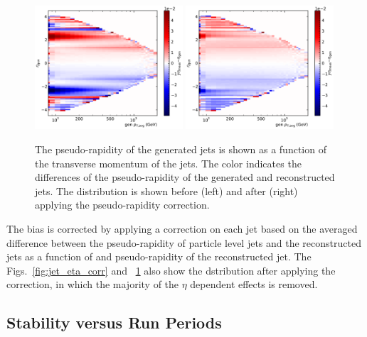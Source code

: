 \begin{figure}[htbp]
    \centering
    \includegraphics[width=0.49\textwidth]{figures/measurement/genvsreco_eta_vs_genpt.pdf}\hfill
    \includegraphics[width=0.49\textwidth]{figures/measurement/genvsreco_eta_vs_genpt_corr.pdf}
    \caption[Differences of pseudo-rapidity of reconstructed jets to
        generator-level jets vs. transverse momentum]{The pseudo-rapidity of the
            generated jets is shown as a function of the transverse momentum of
            the jets. The color indicates the differences of the pseudo-rapidity
            of the generated and reconstructed jets. The distribution is shown
            before (left) and after (right) applying the pseudo-rapidity
        correction.}
    \label{fig:jet_eta_corr_vs_pt}
\end{figure}

The bias is corrected by applying a correction on each jet based on the averaged
difference between the pseudo-rapidity of particle level jets and the
reconstructed jets as a function of \pt and pseudo-rapidity of the reconstructed
jet. The Figs.~\ref{fig:jet_eta_corr} and ~\ref{fig:jet_eta_corr_vs_pt} also
show the dstribution after applying the correction, in which the majority of the
$\eta$ dependent effects is removed.

\subsection{Stability versus Run Periods}

